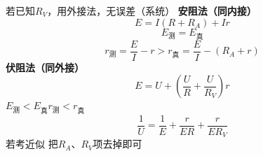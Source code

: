 若已知$R_V$，用外接法，无误差（系统）
\textbf{安阻法（同内接）}
\[
E=I(R+R_A)+Ir
\]
\[
E_{\text{测}}=E_{\text{真}}
\]
\[
r_{\text{测}}=\frac{E}{I}-r>r_{\text{真}}=\frac{E}{I}-(R_A+r)
\]
\textbf{伏阻法（同外接）}
\[
E=U+\left(\frac{U}{R}+\frac{U}{R_V}\right)r
\]
$E_{\text{测}}<E_{\text{真}}$\qquad $r_{\text{测}}<r_{\text{真}}$
\[
\frac{1}{U}=\frac{1}{E}+\frac{r}{ER}+\frac{r}{ER_V}
\]
若考近似 把$R_A$、$R_V$项去掉即可
